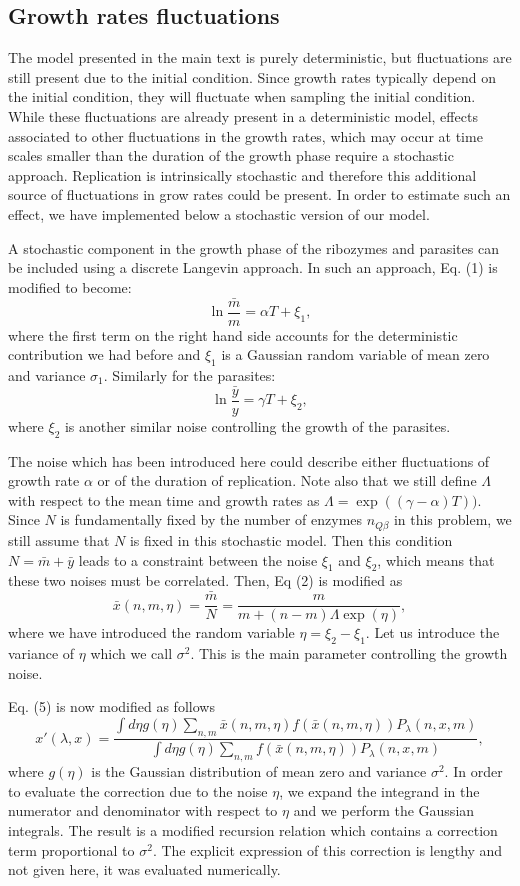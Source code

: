 \documentclass[twocolumn,showpacs,floatfix]{revtex4-1}
\newcommand{\xb}{{\bar x}}
\newcommand{\be}{\begin{equation}}
\newcommand{\ee}{\end{equation}}
\begin{document}
\begin{thebibliography}{99}
\begin{widetext}
\section{Growth rates fluctuations}
The model presented in the main text is purely deterministic, but 
fluctuations are still present due to the initial condition. 
Since growth rates typically depend on the initial condition, they will fluctuate 
when sampling the initial condition. 
While these fluctuations are already present in a deterministic model, 
effects associated to other fluctuations 
in the growth rates, which may occur at time scales smaller than the duration of the growth phase
require a stochastic approach. 
Replication is intrinsically stochastic and therefore this additional source of 
fluctuations in grow rates could be present.
In order to estimate such an effect, we have implemented below a stochastic version of our
model. 

A stochastic component in the growth phase of the ribozymes 
and parasites can be included using a discrete Langevin approach. 
In such an approach, Eq. (1) is modified to become:
\be
\ln \frac{\bar{m}}{m}=\alpha T + \xi_1,
\ee
where the first term on the right hand side accounts for the deterministic contribution
 we had before and $\xi_1$ is a Gaussian random variable of mean zero and 
variance $\sigma_1$. 
Similarly for the parasites:
\be
\ln \frac{\bar{y}}{y}=\gamma T + \xi_2,
\ee
where $\xi_2$ is another similar noise controlling the growth of the parasites.


The noise which has been introduced here could describe  
either fluctuations of growth rate $\alpha$ or of the duration of replication. Note also that we still define $\Lambda$ with respect to the mean time and growth rates as 
$\Lambda=\exp ((\gamma - \alpha) T ))$. Since $N$ is fundamentally fixed by 
the number of enzymes $n_{Q\beta}$ in this problem,  
we still assume that $N$ is fixed in this stochastic model.
Then this condition $N=\bar{m}+ \bar{y}$ leads to a constraint between 
the noise $\xi_1$ and $\xi_2$, which means that these two noises must be correlated.
Then, Eq (2) is modified as
\be
\xb(n,m,\eta)=\frac{\bar{m}}{N}=\frac{m}{m + (n-m) \Lambda \exp{(\eta)}},
\label{xb}
\ee
where we have introduced the random variable $\eta=\xi_2 -\xi_1$. Let us introduce the variance of $\eta$ which we call $\sigma^2$. This is the main parameter controlling the growth noise. 

Eq. (5) is now modified as follows
\be
\label{Recursion}
x'(\lambda,x)=\frac{\int d\eta g(\eta) \sum_{n,m} \xb(n,m,\eta) f(\xb(n,m,\eta)) P_\lambda(n,x,m)}{\int d\eta g(\eta) \sum_{n,m} f(\xb(n,m,\eta)) P_\lambda(n,x,m)},
\ee
where $g(\eta)$ is the Gaussian distribution of mean zero and variance $\sigma^2$.
In order to evaluate the correction due to the noise $\eta$, we expand the integrand in the numerator 
and denominator with respect to $\eta$ and we perform the Gaussian integrals.
The result is a modified recursion relation which contains a correction term proportional to $\sigma^2$.
The explicit expression of this correction is lengthy and not given here, it was evaluated numerically.


\end{widetext}
\end{thebibliography}
\end{document}
